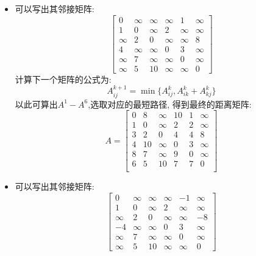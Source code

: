 \documentclass[../../main.tex]{subfiles}
\begin{document}
\begin{solution}
    \begin{itemize}
        \item [图1:]
        可以写出其邻接矩阵:
        \[
        \begin{bmatrix}
            0      & \infty & \infty & \infty & 1      & \infty \\
            1      & 0      & \infty &  2     & \infty & \infty \\
            \infty & 2      & 0      & \infty & \infty & 8      \\
            4      & \infty & \infty & 0      & 3      & \infty \\
            \infty & 7      & \infty & \infty & 0      & \infty \\
            \infty & 5      & 10     & \infty & \infty & 0
        \end{bmatrix}
        \]
        计算下一个矩阵的公式为:
        \[
        A^{k+1}_{ij} = \min \{ A^k_{ij}, A^k_{ik} + A^k_{kj} \}
        \]
        以此可算出\(A^1 - A^6\),选取对应的最短路径, 得到最终的距离矩阵:
        \[
        A = 
        \begin{bmatrix}
            0& 8& \infty& 10& 1& \infty \\
            1& 0& \infty& 2& 2& \infty \\
            3& 2& 0& 4& 4& 8 \\
            4& 10& \infty& 0& 3& \infty \\
            8& 7& \infty& 9& 0& \infty \\
            6& 5& 10& 7& 7& 0 \\
        \end{bmatrix}
        \]
        \item [图2:]
        可以写出其邻接矩阵:
        \[
        \begin{bmatrix}
            0      & \infty & \infty & \infty & -1     & \infty \\
            1      & 0      & \infty &  2     & \infty & \infty \\
            \infty & 2      & 0      & \infty & \infty & -8      \\
            -4      & \infty & \infty & 0     &  3     & \infty \\
            \infty & 7      & \infty & \infty & 0      & \infty \\
            \infty & 5      & 10     & \infty & \infty & 0
        \end{bmatrix}
        \]

\end{itemize}
\end{solution}
\end{document}
